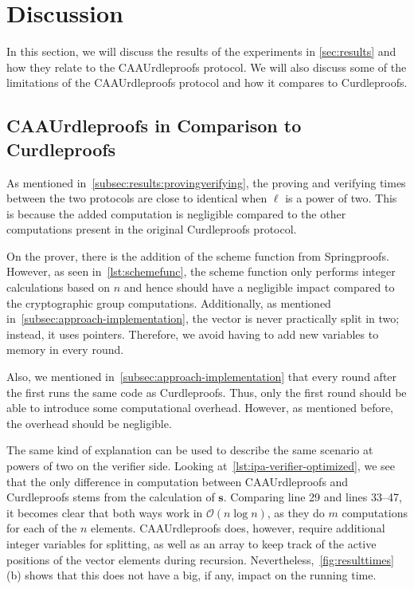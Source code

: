

\section{Discussion}\label{sec:discussion}
In this section, we will discuss the results of the experiments in \autoref{sec:results} and how they relate to the CAAUrdleproofs protocol.
We will also discuss some of the limitations of the CAAUrdleproofs protocol and how it compares to Curdleproofs.


\subsection{CAAUrdleproofs in Comparison to Curdleproofs}\label{subsec:CAAUrdleproofs-vs-Curdleproofs}
As mentioned in~\autoref{subsec:results:provingverifying}, the proving and verifying times between the two protocols are close to identical when $\ell$ is a power of two.
This is because the added computation is negligible compared to the other computations present in the original Curdleproofs protocol.

On the prover, there is the addition of the scheme function from Springproofs.
However, as seen in~\autoref{lst:schemefunc}, the scheme function only performs integer calculations based on $n$ and hence should have a negligible impact compared to the cryptographic group computations.
Additionally, as mentioned in~\autoref{subsec:approach-implementation}, the vector is never practically split in two; instead, it uses pointers.
Therefore, we avoid having to add new variables to memory in every round.

Also, we mentioned in~\autoref{subsec:approach-implementation} that every round after the first runs the same code as Curdleproofs.
Thus, only the first round should be able to introduce some computational overhead.
However, as mentioned before, the overhead should be negligible.

The same kind of explanation can be used to describe the same scenario at powers of two on the verifier side.
Looking at~\autoref{lst:ipa-verifier-optimized}, we see that the only difference in computation between CAAUrdleproofs and Curdleproofs stems from the calculation of $\mathbf{s}$.
Comparing line 29 and lines 33--47, it becomes clear that both ways work in $\mathcal{O}(n\log n)$, as they do $m$ computations for each of the $n$ elements.
CAAUrdleproofs does, however, require additional integer variables for splitting, as well as an array to keep track of the active positions of the vector elements during recursion.
Nevertheless,~\autoref{fig:resulttimes}(b) shows that this does not have a big, if any, impact on the running time.

